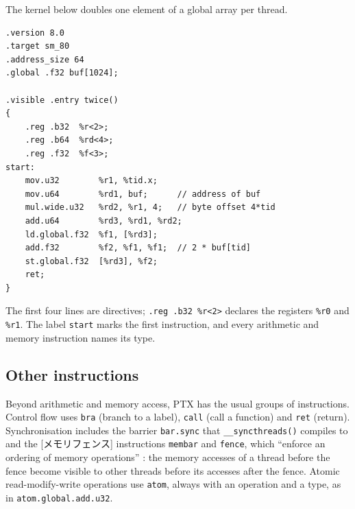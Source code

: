 \documentclass[../main.tex]{subfiles}
\begin{document}
\begin{example}
  \label{ex:l10-ptx-kernel}
  The kernel below doubles one element of a global array per thread.
\begin{lstlisting}[language=PTX, numbers=none]
.version 8.0
.target sm_80
.address_size 64
.global .f32 buf[1024];

.visible .entry twice()
{
    .reg .b32  %r<2>;
    .reg .b64  %rd<4>;
    .reg .f32  %f<3>;
start:
    mov.u32        %r1, %tid.x;
    mov.u64        %rd1, buf;      // address of buf
    mul.wide.u32   %rd2, %r1, 4;   // byte offset 4*tid
    add.u64        %rd3, %rd1, %rd2;
    ld.global.f32  %f1, [%rd3];
    add.f32        %f2, %f1, %f1;  // 2 * buf[tid]
    st.global.f32  [%rd3], %f2;
    ret;
}
\end{lstlisting}
  The first four lines are directives; \texttt{.reg .b32 \%r<2>}
  declares the registers \texttt{\%r0} and \texttt{\%r1}.  The label
  \texttt{start} marks the first instruction, and every arithmetic and
  memory instruction names its type.
\end{example}


\subsection{Other instructions}

Beyond arithmetic and memory access, PTX has the usual groups of
instructions.  Control flow uses \texttt{bra} (branch to a label),
\texttt{call} (call a function) and \texttt{ret} (return).
Synchronisation includes the barrier \texttt{bar.sync} that
\texttt{\_\_syncthreads()} compiles to and the
[メモリフェンス] instructions \texttt{membar} and
\texttt{fence}, which \enquote{enforce an ordering of memory
operations} \cite[§9.7.15.4]{nvidia2026ptx}: the memory accesses of a
thread before the fence become visible to other threads before its
accesses after the fence.  Atomic read-modify-write operations use
\texttt{atom}, always with an operation and a type, as in
\texttt{atom.global.add.u32}.
\end{document}
